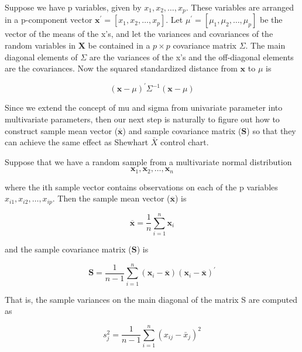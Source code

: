 Suppose we have p variables, given by $x_{1}, x_{2}, \ldots, x_{p}$. These variables are arranged in a p-component vector $\mathbf{x}^{\prime}=\left[x_{1}, x_{2}, \ldots, x_{p}\right]$. Let $\mu^{\prime}=\left[\mu_{1}, \mu_{2}, \ldots, \mu_{p}\right]$ be the vector of the means of the x’s, and let the variances and covariances of the random variables in $\mathbf{X}$ be contained in a $p × p$ covariance matrix $\Sigma$. The main diagonal elements of $\Sigma$ are the variances of the x’s and the off-diagonal elements are the covariances. Now the squared standardized distance from $\mathbf{x}$ to $\mu$ is

\begin{equation}
    (\mathbf{x}-\mu)^{\prime} \Sigma^{-1}(\mathbf{x}-\mu)
    \label{equ:squared standardized (generalized) distance}
\end{equation}

Since we extend the concept of mu and sigma from univariate parameter into multivariate parameters, then our next step is naturally to figure out how to construct sample mean vector ($\overline{\mathbf{x}}$) and sample covariance matrix ($\mathbf{S}$) so that they can achieve the same effect as Shewhart $\bar{X}$ control chart.

Suppose that we have a random sample from a multivariate normal distribution
\begin{equation}
\mathbf{x}_{1}, \mathbf{x}_{2}, \ldots, \mathbf{x}_{n}
\label{equ:x1_xn}
\end{equation}

where the ith sample vector contains observations on each of the p variables 
$x_{i 1}, x_{i 2}, \ldots, x_{i p}$. Then the sample mean vector ($\overline{\mathbf{x}}$) is

\begin{equation}
\overline{\mathbf{x}}=\frac{1}{n} \sum_{i=1}^{n} \mathbf{x}_{i}
\label{equ:x_mean}
\end{equation}

and the sample covariance matrix ($\mathbf{S}$) is

\begin{equation}
\mathbf{S}=\frac{1}{n-1} \sum_{i=1}^{n}\left(\mathbf{x}_{i}-\overline{\mathbf{x}}\right)\left(\mathbf{x}_{i}-\overline{\mathbf{x}}\right)^{\prime}
\label{equ:S_x}
\end{equation}

That is, the sample variances on the main diagonal of the matrix S are computed as

\begin{equation}
s_{j}^{2}=\frac{1}{n-1} \sum_{i=1}^{n}\left(x_{i j}-\bar{x}_{j}\right)^{2}
\label{equ:S_j}
\end{equation}


